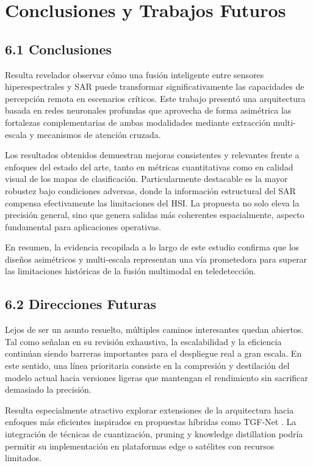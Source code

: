 \section{Conclusiones y Trabajos Futuros}

\subsection{6.1 Conclusiones}

Resulta revelador observar cómo una fusión inteligente entre sensores hiperespectrales y SAR puede transformar significativamente las capacidades de percepción remota en escenarios críticos. Este trabajo presentó una arquitectura basada en redes neuronales profundas que aprovecha de forma asimétrica las fortalezas complementarias de ambas modalidades mediante extracción multi-escala y mecanismos de atención cruzada.

Los resultados obtenidos demuestran mejoras consistentes y relevantes frente a enfoques del estado del arte, tanto en métricas cuantitativas como en calidad visual de los mapas de clasificación. Particularmente destacable es la mayor robustez bajo condiciones adversas, donde la información estructural del SAR compensa efectivamente las limitaciones del HSI. La propuesta no solo eleva la precisión general, sino que genera salidas más coherentes espacialmente, aspecto fundamental para aplicaciones operativas.

En resumen, la evidencia recopilada a lo largo de este estudio confirma que los diseños asimétricos y multi-escala representan una vía prometedora para superar las limitaciones históricas de la fusión multimodal en teledetección.

\subsection{6.2 Direcciones Futuras}

Lejos de ser un asunto resuelto, múltiples caminos interesantes quedan abiertos. Tal como señalan \cite{Li2022Deep} en su revisión exhaustiva, la escalabilidad y la eficiencia continúan siendo barreras importantes para el despliegue real a gran escala. En este sentido, una línea prioritaria consiste en la compresión y destilación del modelo actual hacia versiones ligeras que mantengan el rendimiento sin sacrificar demasiado la precisión.

Resulta especialmente atractivo explorar extensiones de la arquitectura hacia enfoques más eficientes inspirados en propuestas híbridas como TGF-Net \cite{Wang2025TGF}. La integración de técnicas de cuantización, pruning y knowledge distillation podría permitir su implementación en plataformas edge o satélites con recursos limitados. 

